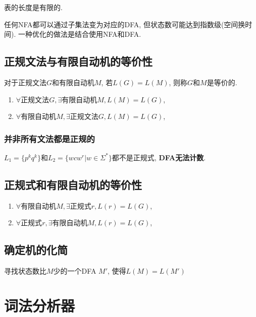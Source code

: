         表的长度是有限的.

        任何NFA都可以通过子集法变为对应的DFA, 但状态数可能达到指数级(空间换时间). 一种优化的做法是结合使用NFA和DFA.

    \subsection{正规文法与有限自动机的等价性}

        对于正规文法$G$和有限自动机$M$, 若$L(G)=L(M)$, 则称$G$和$M$是\textsf{等价}的.

        \begin{enumerate}
            \item $\forall\textrm{正规文法}G, \exists \textrm{有限自动机}M, L(M)=L(G)$,
            \item $\forall\textrm{有限自动机}M, \exists \textrm{正规文法}G, L(M)=L(G)$,
        \end{enumerate}

        \subsubsection{并非所有文法都是正规的}

            $L_1=\{p^kq^k\}$和$L_2=\{wcw^r|w\in\Sigma^*\}$都不是正规式, \textbf{DFA无法计数}.

    \subsection{正规式和有限自动机的等价性}

        \begin{enumerate}
            \item $\forall\textrm{有限自动机}M,\exists\textrm{正规式}r, L(r)=L(G)$,
            \item $\forall\textrm{正规式}r,\exists\textrm{有限自动机}M, L(r)=L(G)$,
        \end{enumerate}

    \subsection{确定机的化简}

        寻找状态数比$M$少的一个DFA $M'$, 使得$L(M)=L(M')$

\section{词法分析器}


